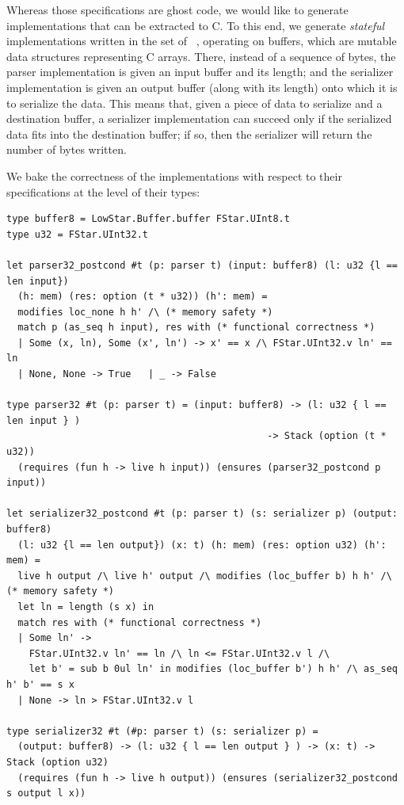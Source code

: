 Whereas those specifications are ghost code, we would like to generate
implementations that can be extracted to C. To this end, we generate
\emph{stateful} implementations written in the \lowstar set of \fstar~\cite{lowstar},
operating on buffers, which are \lowstar mutable data structures
representing C arrays. There, instead of a sequence of bytes, the
parser implementation is given an input buffer and its length; and the
serializer implementation is given an output buffer (along with its
length) onto which it is to serialize the data. This means that, given
a piece of data to serialize and a destination buffer, a serializer
implementation can succeed only if the serialized data fits into the
destination buffer; if so, then the serializer will return the number
of bytes written.

We bake the correctness of the implementations with respect to their
specifications at the level of their types:

\begin{lstlisting}
type buffer8 = LowStar.Buffer.buffer FStar.UInt8.t
type u32 = FStar.UInt32.t

let parser32_postcond #t (p: parser t) (input: buffer8) (l: u32 {l == len input})
  (h: mem) (res: option (t * u32)) (h': mem) =
  modifies loc_none h h' /\ (* memory safety *)
  match p (as_seq h input), res with (* functional correctness *)
  | Some (x, ln), Some (x', ln') -> x' == x /\ FStar.UInt32.v ln' == ln
  | None, None -> True   | _ -> False

type parser32 #t (p: parser t) = (input: buffer8) -> (l: u32 { l == len input } )
                                              -> Stack (option (t * u32))
  (requires (fun h -> live h input)) (ensures (parser32_postcond p input))

let serializer32_postcond #t (p: parser t) (s: serializer p) (output: buffer8)
  (l: u32 {l == len output}) (x: t) (h: mem) (res: option u32) (h': mem) =
  live h output /\ live h' output /\ modifies (loc_buffer b) h h' /\ (* memory safety *)
  let ln = length (s x) in
  match res with (* functional correctness *)
  | Some ln' ->
    FStar.UInt32.v ln' == ln /\ ln <= FStar.UInt32.v l /\
    let b' = sub b 0ul ln' in modifies (loc_buffer b') h h' /\ as_seq h' b' == s x
  | None -> ln > FStar.UInt32.v l

type serializer32 #t (#p: parser t) (s: serializer p) =
  (output: buffer8) -> (l: u32 { l == len output } ) -> (x: t) -> Stack (option u32)
  (requires (fun h -> live h output)) (ensures (serializer32_postcond s output l x))
\end{lstlisting}


